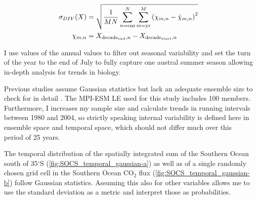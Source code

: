 \begin{align}
\sigma_{DIV}(X) &= \sqrt{\frac{1}{M N} \sum_{n=\text{ens}}^{N} \sum_{m=\text{yr}}^{M} \left( \chi_{m,n} -\bar{\chi}_{m,n}\right)^{2}} \\
\chi_{m,n}&=X_{\text{decade}_{\text{end}},n}-X_{\text{decade}_{\text{start}},n} \notag
\end{align}


I use values of the annual values to filter out seasonal variability and set the turn of the year to the end of July to fully capture one austral summer season allowing in-depth analysis for trends in biology.\newline

Previous studies assume Gaussian statistics but lack an adequate ensemble size to check for in detail \citep{Deser2012,Thompson2015}. The \ac{MPI-ESM LE} used for this study includes 100 members. Furthermore, I increases my sample size and calculate trends in running intervals between 1980 and 2004, so strictly speaking internal variability is defined here in ensemble space and temporal space, which should not differ much over this period of 25 years.

The temporal distribution of the spatially integrated sum of the  Southern Ocean south of 35$^\circ$S (\autoref{fig:SOCS_temporal_gaussian-a}) as well as of a single randomly chosen grid cell in the Southern Ocean CO$_2$ flux (\autoref{fig:SOCS_temporal_gaussian-b}) follow Gaussian statistics. Assuming this also for other variables allows me to use the standard deviation as a metric and interpret those as probabilities.







